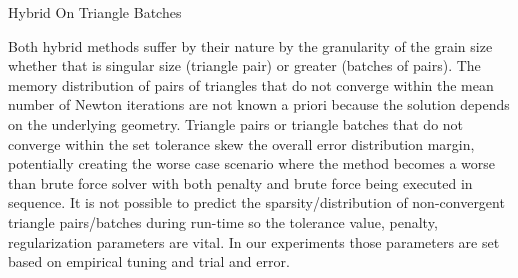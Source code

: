 \begin{algorithm}
 \caption{Hybrid On Triangle Batches} \label{algorithm:hybridBatches}
 \begin{algorithmic}[1]
	
	
	
					

			\EndFor
			
				
	

				\EndFor
	
			\EndIf
	
		\EndFor
	
	
	\EndFunction
	
 \end{algorithmic}
\end{algorithm} 

Both hybrid methods suffer by their nature by the granularity of the grain size whether that is singular size (triangle pair) or greater (batches of pairs).
The memory distribution of pairs of triangles that do not converge within the mean number of Newton iterations are not known a priori because the solution depends on the underlying geometry. Triangle pairs or triangle batches that do not converge within the set tolerance skew the overall error distribution margin, potentially creating the worse case scenario where the method becomes a worse than brute force solver with both penalty and brute force being executed in sequence. It is not possible to predict the sparsity/distribution of non-convergent triangle pairs/batches during run-time so the tolerance value, penalty, regularization parameters are vital. In our experiments those parameters are set based on empirical tuning and trial and error.

